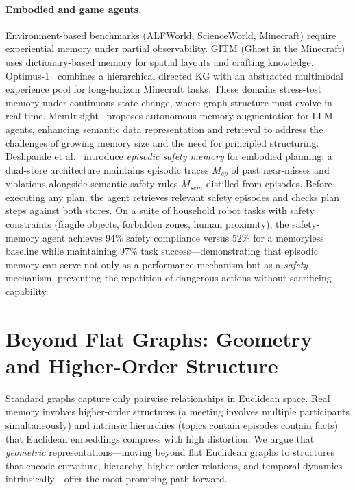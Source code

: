 \documentclass[hf]{ceurart}
\begin{document}
\paragraph{Embodied and game agents.}
Environment-based benchmarks (ALFWorld, ScienceWorld, Minecraft)
require experiential memory under partial observability. GITM
(Ghost in the Minecraft)~\cite{gitm2023} uses dictionary-based
memory for spatial layouts and crafting knowledge.
Optimus-1~\cite{optimus2024} combines a hierarchical directed KG
with an abstracted multimodal experience pool for long-horizon
Minecraft tasks. These domains stress-test memory under continuous
state change, where graph structure must evolve in real-time.
MemInsight~\cite{meminsight2025} proposes autonomous memory
augmentation for LLM agents, enhancing semantic data representation
and retrieval to address the challenges of growing memory size and
the need for principled structuring.
Deshpande et al.~\cite{saferobot2026} introduce \emph{episodic
safety memory} for embodied planning: a dual-store architecture
maintains episodic traces $M_{ep}$ of past near-misses and
violations alongside semantic safety rules $M_{sem}$ distilled from
episodes. Before executing any plan, the agent retrieves relevant
safety episodes and checks plan steps against both stores. On a
suite of household robot tasks with safety constraints (fragile
objects, forbidden zones, human proximity), the safety-memory agent
achieves 94\% safety compliance versus 52\% for a memoryless
baseline while maintaining 97\% task success---demonstrating that
episodic memory can serve not only as a performance mechanism but
as a \emph{safety} mechanism, preventing the repetition of
dangerous actions without sacrificing capability.


\section{Beyond Flat Graphs: Geometry and Higher-Order Structure}
\label{sec:geometric}

Standard graphs capture only pairwise relationships in Euclidean space.
Real memory involves higher-order structures (a meeting involves
multiple participants simultaneously) and intrinsic hierarchies (topics
contain episodes contain facts) that Euclidean embeddings compress with
high distortion. We argue that \emph{geometric} representations---moving
beyond flat Euclidean graphs to structures that encode curvature,
hierarchy, higher-order relations, and temporal dynamics
intrinsically---offer the most promising path forward.
\end{document}
